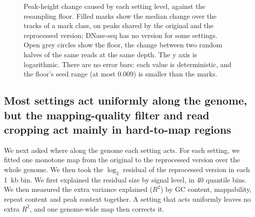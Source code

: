 \documentclass[pdflatex,sn-mathphys-num]{sn-jnl}
\newcommand{\lit}[1]{#1}
\newcommand{\phFloorSpreadHi}{0.009}
\begin{document}
\begin{figure}[t]
\centering
{}
\caption{Peak-height change caused by each setting level, against the resampling floor. Filled
marks show the median change over the tracks of a mark class, on peaks shared by the original
and the reprocessed version; DNase-seq has no version for some settings. Open grey circles
show the floor, the change between two random halves of the same reads at the same depth. The
y axis is logarithmic. There are no error bars: each value is deterministic, and the floor's
seed range (at most \phFloorSpreadHi{}) is smaller than the marks.}\label{fig:peak}
\end{figure}

\subsection{Most settings act uniformly along the genome, but the mapping-quality filter and read cropping act mainly in hard-to-map regions}\label{sec:r2}

We next asked where along the genome each setting acts. For each setting, we fitted one
monotone map from the original to the reprocessed version over the whole genome. We then took
the $\log_{\lit{2}}$ residual of the reprocessed version in each \lit{1}~kb bin. We first
explained the residual size by signal level, in \lit{40} quantile bins. We then measured the
extra variance explained ($R^{\lit{2}}$) by GC content, mappability, repeat content and peak
context together. A setting that acts uniformly leaves no extra $R^{\lit{2}}$, and one genome-wide
map then corrects it.
\end{document}

